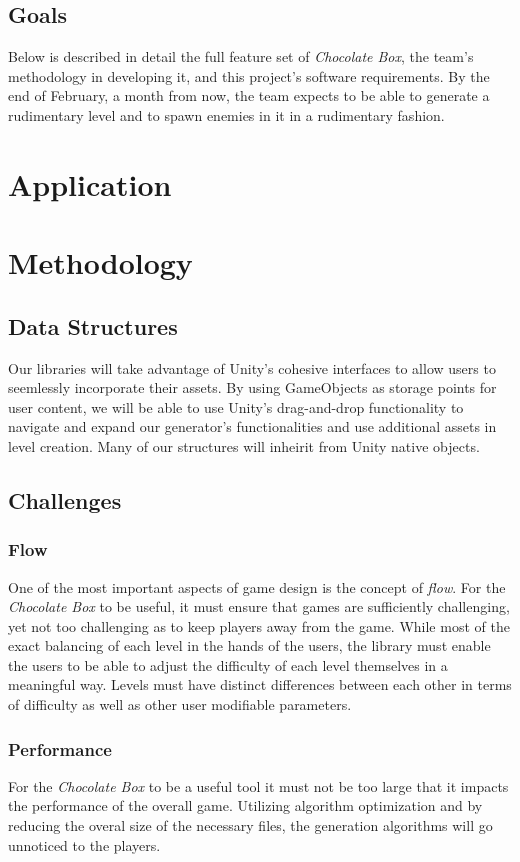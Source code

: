 \documentclass[pdftex,12pt,letter]{article}
\begin{document}
\subsection{Goals}
Below is described in detail the full feature set of \textit{Chocolate Box}, the team's methodology in developing it, and this project's software requirements. By the end of February, a month from now, the team expects to be able to generate a rudimentary level and to spawn enemies in it in a rudimentary fashion.

\section{Application}

\section{Methodology}
\subsection{Data Structures}
Our libraries will take advantage of Unity's cohesive interfaces to allow users to seemlessly incorporate their assets. By using GameObjects as storage points for user content, we will be able to use Unity's drag-and-drop functionality to navigate and expand our generator's functionalities and use additional assets in level creation. Many of our structures will inheirit from  Unity native objects.

\subsection{Challenges}
\subsubsection{Flow}
One of the most important aspects of game design is the concept of \textit{flow}.  For the \textit{Chocolate Box} to be useful, it must ensure that games are sufficiently challenging, yet not too challenging as to keep players away from the game. While most of the  exact balancing of each level in the hands of the users, the library must enable the users to be able to adjust the difficulty of each level themselves in a meaningful way. Levels must have distinct differences between each other in terms of difficulty as well as other user modifiable parameters. 
\subsubsection{Performance}
For the \textit{Chocolate Box} to be a useful tool it must not be too large that it impacts the performance of the overall game. Utilizing algorithm optimization and by reducing the overal size of the necessary files, the generation algorithms will go unnoticed to the players. 
\end{document}
